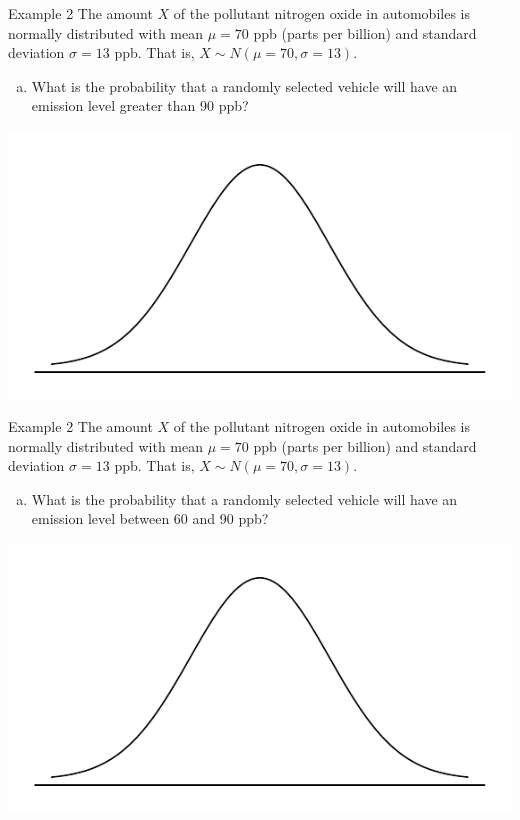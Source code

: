 \documentclass{beamer}
\begin{document}
\begin{frame}{Example 2}
\vspace{-1.75cm}
\small
The amount $X$ of the pollutant nitrogen oxide in automobiles is normally distributed with mean $\mu=70$ ppb (parts per billion) and standard deviation $\sigma = 13$ ppb.  That is, $X \sim N(\mu = 70, \sigma = 13)$.
\begin{enumerate}[(b)]
\item What is the probability that a randomly selected vehicle will have an emission level greater than 90 ppb?
\end{enumerate}
\includegraphics[scale=0.5]{figure/norm_draw.pdf}
\end{frame}

\begin{frame}{Example 2}
\vspace{-1.75cm}
\small
The amount $X$ of the pollutant nitrogen oxide in automobiles is normally distributed with mean $\mu=70$ ppb (parts per billion) and standard deviation $\sigma = 13$ ppb.  That is, $X \sim N(\mu = 70, \sigma = 13)$.
\begin{enumerate}[(c)]
\item What is the probability that a randomly selected vehicle will have an emission level between 60 and 90 ppb?
\end{enumerate}
\includegraphics[scale=0.5]{figure/norm_draw.pdf}
\end{frame}
\end{document}
